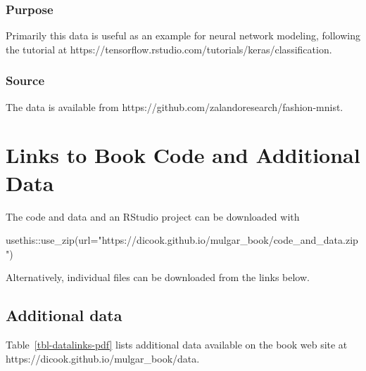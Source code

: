 \documentclass[
  letterpaper,
]{krantz}
\newenvironment{Shaded}{\begin{snugshade}}{\end{snugshade}}
\newcommand{\AttributeTok}[1]{\textcolor[rgb]{0.40,0.45,0.13}{#1}}
\newcommand{\FunctionTok}[1]{\textcolor[rgb]{0.28,0.35,0.67}{#1}}
\newcommand{\NormalTok}[1]{\textcolor[rgb]{0.00,0.23,0.31}{#1}}
\newcommand{\SpecialCharTok}[1]{\textcolor[rgb]{0.37,0.37,0.37}{#1}}
\newcommand{\StringTok}[1]{\textcolor[rgb]{0.13,0.47,0.30}{#1}}
\begin{document}
\subsection*{Purpose}\label{purpose-10}

Primarily this data is useful as an example for neural network modeling,
following the tutorial at
https://tensorflow.rstudio.com/tutorials/keras/classification.

\subsection*{Source}\label{source-10}

The data is available from
https://github.com/zalandoresearch/fashion-mnist.

\chapter{Links to Book Code and Additional Data}\label{book-data}

The code and data and an RStudio project can be downloaded with

\begin{Shaded}
\begin{Highlighting}[]
\NormalTok{usethis}\SpecialCharTok{::}\FunctionTok{use\_zip}\NormalTok{(}\AttributeTok{url=}\StringTok{"https://dicook.github.io/mulgar\_book/code\_and\_data.zip"}\NormalTok{)}
\end{Highlighting}
\end{Shaded}

Alternatively, individual files can be downloaded from the links below.

\section{Additional data}\label{additional-data}

Table~\ref{tbl-datalinks-pdf} lists additional data available on the
book web site at https://dicook.github.io/mulgar\_book/data.
\end{document}
